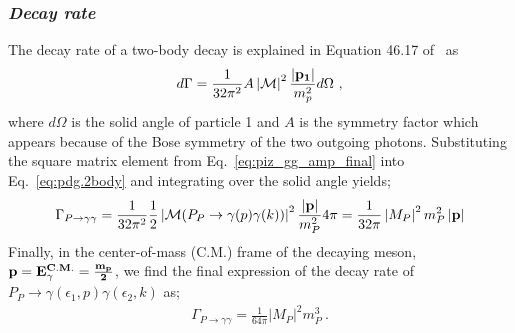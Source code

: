 \subsubsection{\emph{Decay rate}}
The decay rate of a two-body decay is explained in Equation 46.17 of~\cite{pdg2014} as
\begin{align}\label{eq:pdg.2body}
d\Gamma = \frac{1}{32 \pi^2} A \left|{\cal M}\right|^2\frac{\left|\bf{p_1}\right|}{m_p^2}d\Omega \ ,
\end{align}
where $d\Omega$ is the solid angle of particle 1 and $A$ is the symmetry factor which appears because of the Bose symmetry of the two
outgoing photons. Substituting the square matrix element from Eq.~\ref{eq:piz_gg_amp_final} into Eq.~\ref{eq:pdg.2body} and integrating over the solid angle yields;
\begin{align}
\Gamma_{P\rightarrow\gamma\gamma} = \frac{1}{32\pi^{2}} \frac{1}{2} \left|{\cal M}(P_{P}\to\gamma(p)\gamma(k))\right|^{2} \frac{\left|\bf{p}\right|}{m_{P}^2} 4 \pi = \frac{1}{32 \pi}\left|M_{P}\right|^{2}m_{P}^{2}\left|\bf{p}\right|
\end{align} 
Finally, in the center-of-mass (C.M.) frame of the decaying meson, $\bf{p} = E_{\gamma}^{C.M.} = \frac{m_p}{2}$, we find the final expression of the decay rate of $P_P \to \gamma(\epsilon_1,p) \gamma(\epsilon_2,k)$ as;
\begin{align}\label{eq:piz.gg.decay.final}
\Gamma_{P\rightarrow\gamma\gamma} = \frac{1}{64\pi} \left|M_{P}\right|^{2}m_{P}^{3} \ .
\end{align}


%
